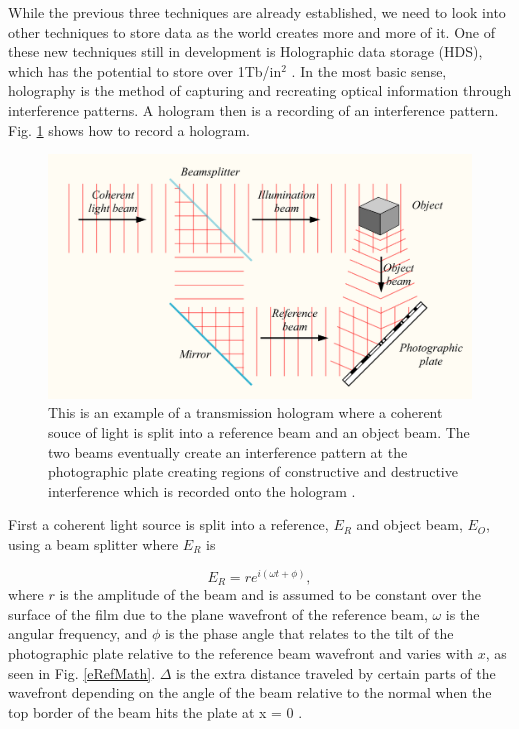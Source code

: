 \documentclass[ notitlepage, numerical, 11pt]{revtex4-1} %
\begin{document}
While the previous three techniques are already established, we need to look into other techniques to store data as the world creates more and more of it. One of these new techniques still in development is Holographic data storage (HDS), which has the potential to store over 1Tb/in$^2$ \cite{HDS}. In the most basic sense, holography is the method of capturing and recreating optical information through interference patterns. A hologram then is a recording of an interference pattern. Fig. \ref{create} shows how to record a hologram. 

\begin{figure}[H]
\centerline{\includegraphics[scale=.45]{create.png}}
\caption{This is an example of a transmission hologram where a coherent souce of light is split into a reference beam and an object beam. The two beams eventually create an interference pattern at the photographic plate creating regions of constructive and destructive interference which is recorded onto the hologram \cite{wikiHolo}.}
\label{create}
\end{figure} 
First a coherent light source is split into a reference, $E_R$ and object beam, $E_O$, using a beam splitter where $E_R$ is

\begin{equation}
E_{R} = re^{i(\omega t + \phi)},
\label{eRef}
\end{equation}
where $r$ is the amplitude of the beam and is assumed to be constant over the surface of the film due to the plane wavefront of the reference beam, $\omega$ is the angular frequency, and $\phi$ is the phase angle that relates to the tilt of the photographic plate relative to the reference beam wavefront and varies with $x$, as seen in Fig. \ref{eRefMath}. $\Delta$ is the extra distance traveled by certain parts of the wavefront depending on the angle of the beam relative to the normal when the top border of the beam hits the plate at x = 0 \cite{optics}.
\end{document}
